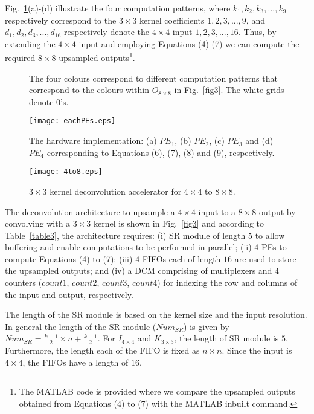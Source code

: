 \documentclass[journal]{IEEEtran}
\begin{document}
Fig.~\ref{fig4}(a)-(d) illustrate the four computation patterns, where $k_1, k_2, k_3, ..., k_9$ respectively correspond to the $3 \times 3$ kernel coefficients $1, 2, 3, ..., 9$, and $d_1, d_2, d_3, ..., d_{16}$ respectively denote the $4 \times 4$ input $1, 2, 3, ..., 16 $. Thus, by extending the $4\times4$ input and employing Equations (4)-(7) we can compute the required $8\times8$ upsampled outputs\footnote{The MATLAB code is provided where we compare  the upsampled outputs obtained from Equations (4) to (7) with the MATLAB inbuilt command.}.

\begin{figure}[htb]
	\centering
	\quad
	\quad
	\quad
	\caption{The four colours correspond to different computation patterns that correspond to the colours within $O_{8\times8}$ in Fig.~\ref{fig3}. The white grids denote 0's.}
\label{fig4}
\end{figure}

\begin{figure}[h]
	\centering
	\texttt{[image: eachPEs.eps]}
	\caption{The hardware implementation: (a) $PE_1$, (b) $PE_2$, (c) $PE_3$ and (d) $PE_4$ corresponding to Equations (6), (7), (8) and (9), respectively.}
	\label{fig7}
\end{figure}


\begin{figure}[h]
	\centering
	\texttt{[image: 4to8.eps]}
	\caption{$3 \times 3$ kernel deconvolution accelerator for $4 \times 4$ to $8 \times 8$.}
	\label{fig5}
\end{figure}


The deconvolution architecture to upsample a $4\times 4$ input to a $8\times 8$ output by convolving with a $3 \times 3$ kernel is shown in Fig.~\ref{fig3} and according to  Table~\ref{table3}, the architecture requires: (i) SR module of length $5$ to allow buffering and enable computations to be performed in parallel; (ii) $4$ PEs  to compute Equations (4) to (7); (iii) $4$ FIFOs each of length $16$ are used to store the upsampled outputs; and  (iv) a DCM comprising of multiplexers and $4$ counters ($count1$, $count2$, $count3$, $count4$) for indexing the row and columns of the input and output, respectively.

The length of the SR module is based on the kernel size and the input resolution. In general the length of the SR module ($Num_{SR}$) is given by $Num_{SR} = \frac{k-1}{2} \times n + \frac{k-1}{2}$. For $I_{4\times 4}$  and $K_{3 \times 3}$, the length of SR module is $5$. Furthermore, the length each of the  FIFO is fixed as $n\times n$. Since the input is $4\times 4$, the FIFOs have a length of $16$. 
\end{document}
